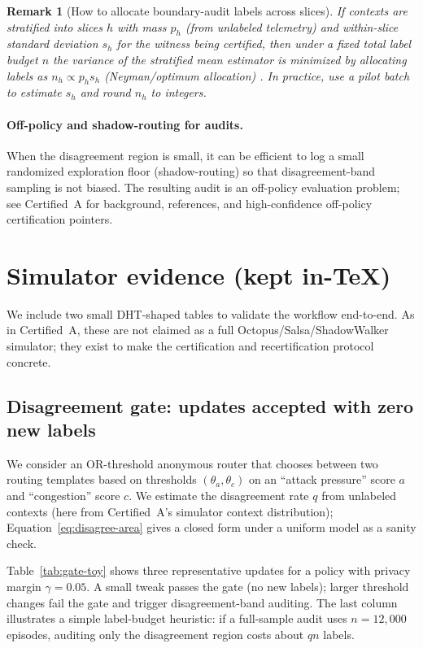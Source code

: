 \documentclass[11pt]{article}
\newtheorem{remark}{Remark}
\begin{document}
\begin{remark}[How to allocate boundary-audit labels across slices]
If contexts are stratified into slices $h$ with mass $p_h$ (from unlabeled telemetry) and within-slice standard deviation $s_h$ for the witness being certified, then under a fixed total label budget $n$ the variance of the stratified mean estimator is minimized by allocating labels as
$n_h \propto p_h s_h$ (Neyman/optimum allocation) \cite{neyman1934,cochran1977}.
In practice, use a pilot batch to estimate $s_h$ and round $n_h$ to integers.
\end{remark}



\paragraph{Off-policy and shadow-routing for audits.}
When the disagreement region is small, it can be efficient to log a small randomized exploration floor (shadow-routing) so that disagreement-band sampling is not biased.
The resulting audit is an off-policy evaluation problem; see Certified~A for background, references, and high-confidence off-policy certification pointers.

\section{Simulator evidence (kept in-\TeX)}
We include two small DHT-shaped tables to validate the workflow end-to-end.
As in Certified~A, these are not claimed as a full Octopus/Salsa/ShadowWalker simulator; they exist to make the certification and recertification protocol concrete.

\subsection{Disagreement gate: updates accepted with zero new labels}
We consider an OR-threshold anonymous router that chooses between two routing templates based on thresholds $(\theta_a,\theta_c)$ on an ``attack pressure'' score $a$ and ``congestion'' score $c$.
We estimate the disagreement rate $q$ from unlabeled contexts (here from Certified~A's simulator context distribution); Equation~\eqref{eq:disagree-area} gives a closed form under a uniform model as a sanity check.

Table~\ref{tab:gate-toy} shows three representative updates for a policy with privacy margin $\gamma=0.05$.
A small tweak passes the gate (no new labels); larger threshold changes fail the gate and trigger disagreement-band auditing.
The last column illustrates a simple label-budget heuristic: if a full-sample audit uses $n=12{,}000$ episodes, auditing only the disagreement region costs about $q n$ labels.
\end{document}
